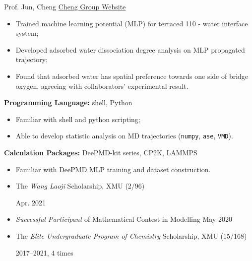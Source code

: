 \vspace{5mm}



{\noindent Prof. Jun, Cheng  \hfill \href{https://chengjun.xmu.edu.cn/}{Cheng Group Website}}


\begin{itemize}
\item Trained machine learning potential (MLP) for terraced  110 - water interface system;
\item Developed adsorbed water dissociation degree analysis on MLP propagated trajectory;
\item Found that adsorbed water has spatial preference towards one side of bridge oxygen, agreeing with collaborators' experimental result.
\end{itemize}


\vspace{5mm}

\sectionrule
{\noindent \textbf{Programming Language:} }{shell, Python}
\begin{itemize}
\item Familiar with shell and python scripting; 
\item Able to develop statistic analysis on MD trajectories (\texttt{numpy}, \texttt{ase}, \texttt{VMD}). 
\end{itemize}

{\noindent \textbf{Calculation Packages:} }{DeePMD-kit series, CP2K, LAMMPS}

\begin{itemize}
\item Familiar with DeePMD MLP training and dataset construction.
\end{itemize}

\vspace{5mm}
\sectionrule

\begin{itemize}
\item The \emph{Wang Laoji} Scholarship, XMU (2/96)

\hfill Apr. 2021
\item \emph{Successful Participant} of Mathematical Contest in Modelling \hfill May 2020
\item The \emph{Elite Undergraduate Program of Chemistry} Scholarship, XMU (15/168)

\hspace*{\fill}2017--2021, 4 times
\end{itemize}
